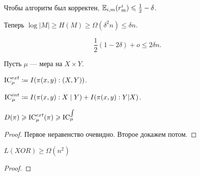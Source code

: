 Чтобы алгоритм был корректен, $ \mathbb{E}_{i, m} (r_m^{i}) \leqslant \frac{1}{2} - \delta $.

Теперь $ \log \lvert M \rvert  \ge H(M) \ge \Omega ( \delta ^2 n) \le  \delta n$.

\[
	\frac{1}{2} (1 - 2\delta )  + o \le 2\delta  n
.\] 

\dotfill

\begin{defn}
Пусть $  \mu$ --- мера на $ X \times Y$. 

$ \operatorname{IC}_{\mu}^{ext} \coloneqq I( \pi(x, y): (X, Y))$.

$ \operatorname{IC}_{\mu}^{int} \coloneqq I( \pi(x, y) : X \mid Y) + I( \pi(x, y) : Y | X) $.
\end{defn}

\begin{thm}
	$ D( \pi) \geqslant  \operatorname{IC}_{\mu}^{ext}( \pi) \geqslant \operatorname{IC}_{ \mu}^{\int}$
\end{thm}
\begin{proof}
    Первое неравенство очевидно. Второе докажем потом.
\end{proof}
\begin{thm}[Храпченко]
	$ L( XOR) \ge \Omega (n^2)$
\end{thm}
\begin{proof}
	\dotfill
\end{proof}
